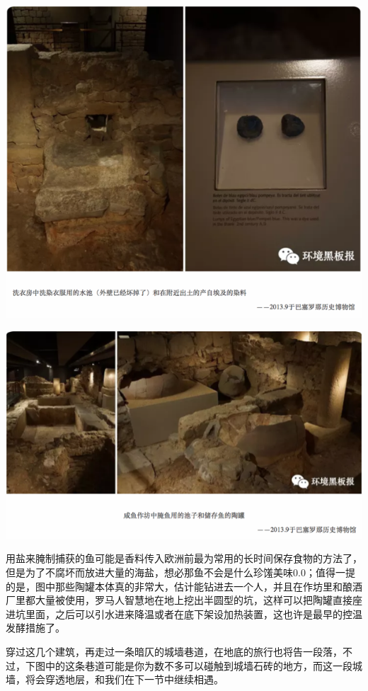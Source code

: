 \documentclass[]{book}
\begin{document}
\includegraphics[width=8.33in]{images/xt16}

\includegraphics[width=8.33in]{images/xt17}

用盐来腌制捕获的鱼可能是香料传入欧洲前最为常用的长时间保存食物的方法了，但是为了不腐坏而放进大量的海盐，想必那鱼不会是什么珍馐美味0.0；值得一提的是，图中那些陶罐本体真的非常大，估计能钻进去一个人，并且在作坊里和酿酒厂里都大量被使用，罗马人智慧地在地上挖出半圆型的坑，这样可以把陶罐直接座进坑里面，之后可以引水进来降温或者在底下架设加热装置，这也许是最早的控温发酵措施了。

穿过这几个建筑，再走过一条暗仄的城墙巷道，在地底的旅行也将告一段落，不过，下图中的这条巷道可能是你为数不多可以碰触到城墙石砖的地方，而这一段城墙，将会穿透地层，和我们在下一节中继续相遇。
\end{document}
